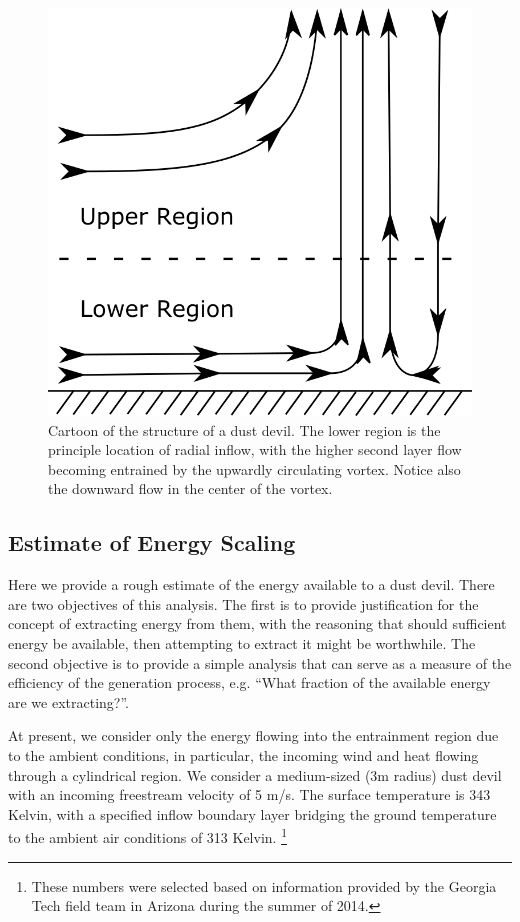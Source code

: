   \begin{figure}[!htb]
    \begin{center}
     \includegraphics[width = 10 cm]{figs/ground}
     \caption{Cartoon of the structure of a dust devil. The lower region
     is the principle location of radial inflow, with the higher second
     layer flow becoming entrained by the upwardly circulating
     vortex. Notice also the downward flow in the center of the vortex.}
     \label{fig:cartoon}
    \end{center}
  \end{figure}


\subsection{Estimate of Energy Scaling}

Here we provide a rough estimate of the energy
available to a dust devil. There are two objectives of this
analysis. The first is to provide justification for the concept of
extracting energy from them, with the reasoning that should
sufficient energy be available, then attempting to extract it might be
worthwhile. The second objective is to provide a simple analysis that
can serve as a measure of the efficiency of the generation process,
e.g. ``What fraction of the available energy are we extracting?''.  

At present, we consider only the energy flowing into the entrainment
region due to the ambient conditions, in particular, the incoming wind
and heat flowing through a cylindrical region. We
consider a medium-sized (3m radius) dust devil with an incoming
freestream velocity of 5 m/s. The surface temperature is 343 Kelvin,
with a specified inflow boundary layer bridging the ground temperature
to the ambient air conditions of 313 Kelvin. 
\footnote{\normalsize These numbers were selected based on information
provided by the Georgia Tech field team in Arizona during the summer of
2014.} 

